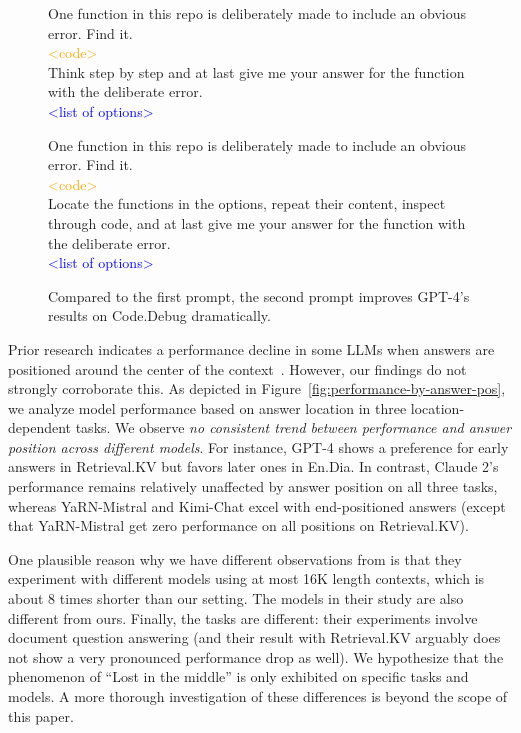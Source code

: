 \begin{figure}[!t]
\begin{tcolorbox}
\small
One function in this repo is deliberately made to include an obvious error. Find it.\\
\textcolor{orange}{<code>}\\
Think step by step and at last give me your answer for the function with the deliberate error.\\
\textcolor{blue}{<list of options>}
\end{tcolorbox}

\begin{tcolorbox}
\small
One function in this repo is deliberately made to include an obvious error. Find it.\\
\textcolor{orange}{<code>}\\
Locate the functions in the options, repeat their content, inspect through code, and at last give me your answer for the function with the deliberate error.\\
\textcolor{blue}{<list of options>}
\end{tcolorbox}
\caption{Compared to the first prompt, the second prompt improves GPT-4's results on Code.Debug dramatically.}
\end{figure}
Prior research indicates a performance decline in some LLMs when answers are positioned around the center of the context~\citep{lost-in-the-middle}. However, our findings do not strongly corroborate this. As depicted in Figure~\ref{fig:performance-by-answer-pos}, we analyze model performance based on answer location in three location-dependent tasks. We observe \textit{no consistent trend between performance and answer position across different models}. For instance, GPT-4 shows a preference for early answers in Retrieval.KV but favors later ones in En.Dia. In contrast, Claude 2's performance remains relatively unaffected by answer position on all three tasks, whereas YaRN-Mistral and Kimi-Chat excel with end-positioned answers (except that YaRN-Mistral get zero performance on all positions on Retrieval.KV).

One plausible reason why we have different observations from \citet{lost-in-the-middle} is that they experiment with different models using at most 16K length contexts, which is about 8 times shorter than our setting. The models in their study are also different from ours.
Finally, the tasks are different: their experiments involve document question answering (and their result with Retrieval.KV arguably does not show a very pronounced performance drop as well). We hypothesize that the phenomenon of ``Lost in the middle'' is only exhibited on specific tasks and models. A more thorough investigation of these differences is beyond the scope of this paper.

